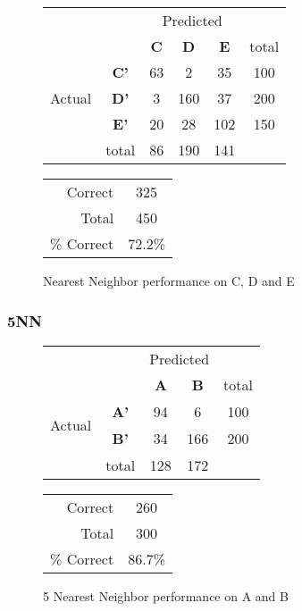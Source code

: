 \begin{figure}[!ht]
\begin{minipage}[b]{0.5\linewidth}
\centering
	\begin{tabular}{ccc|c|c|c}
	 & &\multicolumn{3}{c}{Predicted} &\\
	  & & \bf{C} &  \bf{D} & \bf{E} & total \\
	 \cline{3-5}
	 \multirow{3}{*}{\begin{sideways}Actual\end{sideways}} & \bf{C'}& 63 & 2 & 35 & 100\\
	 \cline{3-6}
	 & \bf{D'}& 3 & 160 & 37 & 200\\
	  \cline{3-6}
	 & \bf{E'}& 20 & 28 & 102 &  150\\
	  \cline{3-6}
	 &total&86&190&141\\
	\end{tabular}
\end{minipage}
\hspace{0.5cm}
\begin{minipage}[b]{0.5\linewidth}
	\begin{tabular}{r|c}
	\hline
	Correct& 325\\
	Total& 450 \\
	\hline
	\% Correct& 72.2\%\\
	\hline
	\end{tabular}
\end{minipage}
\vspace{1mm}
\caption{Nearest Neighbor performance on C, D and E}
\end{figure}


\subsubsection{5NN}
\begin{figure}[!ht]
\begin{minipage}[b]{0.5\linewidth}
\centering
	\begin{tabular}{ccc|c|c}
	 & &\multicolumn{2}{c}{Predicted} &\\
	  & & \bf{A} &  \bf{B} & total \\
	 \cline{3-5}
	 \multirow{2}{*}{\begin{sideways}Actual\end{sideways}} & \bf{A'}& 94 & 6 & 100 \\
	 \cline{3-5}
	 & \bf{B'}& 34 & 166 & 200 \\
	  \cline{3-5}
	 &total&128&172\\
	\end{tabular}
\end{minipage}
\hspace{0.5cm}
\begin{minipage}[b]{0.5\linewidth}
	\begin{tabular}{r|c}
	\hline
	Correct& 260\\
	Total& 300\\
	\hline
	\% Correct& 86.7\%\\
	\hline
	\end{tabular}
\end{minipage}
\vspace{1mm}
\caption{5 Nearest Neighbor performance on A and B}
\end{figure}

